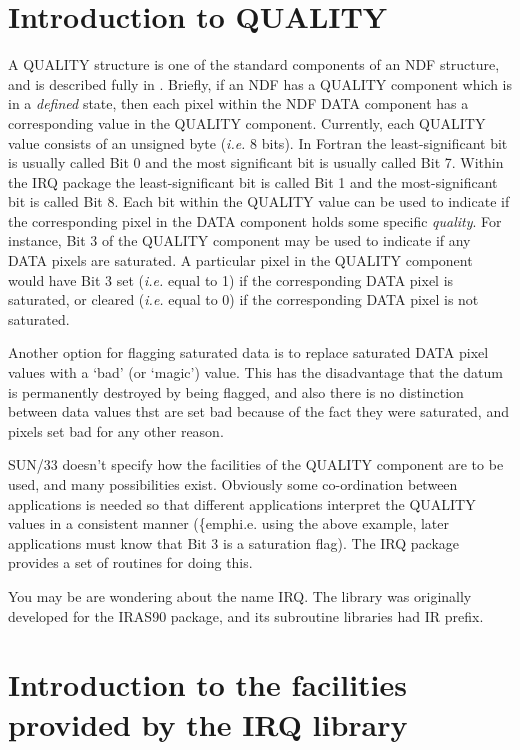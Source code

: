 \documentclass[twoside,11pt,nolof]{starlink}
\begin{document}
\scfrontmatter

\section {Introduction to QUALITY}

A QUALITY structure is one of the standard components of an NDF
structure, and is described fully in
. Briefly,
if an NDF has a QUALITY component which is in a \emph{defined} state,
then each pixel within the NDF DATA component has a corresponding
value in the QUALITY component. Currently, each QUALITY value consists
of an unsigned byte (\emph{i.e.} 8 bits). In Fortran the
least-significant bit is usually called Bit 0 and the most significant
bit is usually called Bit 7. Within the IRQ package the
least-significant bit is called Bit 1 and the most-significant bit is
called Bit 8. Each bit within the QUALITY value can be used to
indicate if the corresponding pixel in the DATA component holds some
specific \emph{quality}. For instance, Bit 3 of the QUALITY component
may be used to indicate if any DATA pixels are saturated. A particular
pixel in the QUALITY component would have Bit 3 set (\emph{i.e.} equal
to 1) if the corresponding DATA pixel is saturated, or cleared
(\emph{i.e.} equal to 0) if the corresponding DATA pixel is not
saturated.

Another option for flagging saturated data is to replace saturated DATA
pixel values with a `bad' (or `magic') value. This has the disadvantage
that the datum is permanently destroyed by being flagged, and also there
is no distinction between data values thst are set bad because of the
fact they were saturated, and pixels set bad for any other reason.

SUN/33 doesn't specify how the facilities of the QUALITY component are to
be used, and many possibilities exist. Obviously some co-ordination
between applications is needed so that different applications interpret
the QUALITY values in a consistent manner (\{emph{i.e.} using the above
example, later applications must know that Bit 3 is a saturation flag).
The IRQ package provides a set of routines for doing this.

You may be are wondering about the name IRQ.  The library was originally
developed for the IRAS90 package, and its subroutine libraries had IR
prefix.

\section {Introduction to the facilities provided by the
IRQ library}
\label {SEC:IRQ}
\end{document}
